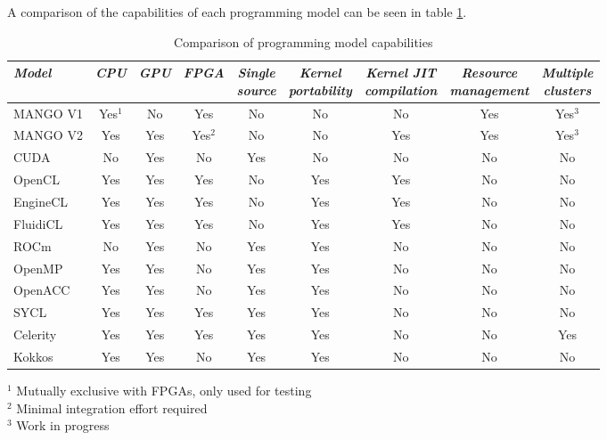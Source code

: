 A comparison of the capabilities of each programming model can be seen in table \ref{tab:progamming-model-comparison}.

\begin{table}[ht]
    \centering
    \begin{tabular}{l|c|c|c|c|c|c|c|c}
    \textit{Model} & \textit{CPU} & \textit{GPU} & \textit{FPGA} & \makecell{\textit{Single} \\ \textit{source}} & \makecell{\textit{Kernel} \\ \textit{portability}} & \makecell{\textit{Kernel JIT} \\ \textit{compilation}} & \makecell{\textit{Resource} \\ \textit{management}} & \makecell{\textit{Multiple} \\ \textit{clusters}} \\ \hline
    MANGO V1 & Yes$^1$ & No & Yes & No & No & No & Yes & Yes$^3$ \\
    MANGO V2 & Yes & Yes & Yes$^2$ & No & No & Yes & Yes & Yes$^3$ \\
    CUDA & No & Yes & No & Yes & No & No & No & No \\
    OpenCL & Yes & Yes & Yes & No & Yes & Yes & No & No \\
    EngineCL & Yes & Yes & Yes & No & Yes & Yes & No & No \\
    FluidiCL & Yes & Yes & Yes & No & Yes & Yes & No & No \\
    ROCm & No & Yes & No & Yes & Yes & No & No & No \\
    OpenMP & Yes & Yes & No & Yes & Yes & No & No & No  \\
    OpenACC & Yes & Yes & No & Yes & Yes & No & No & No  \\
    SYCL & Yes & Yes & Yes & Yes & Yes & No & No & No \\
    Celerity & Yes & Yes & Yes & Yes & Yes & No & No & Yes \\
    Kokkos & Yes & Yes & No & Yes & Yes & No & No & No 
    \end{tabular}
    \begin{flushleft}
    \footnotesize{
        $^1$ Mutually exclusive with FPGAs, only used for testing \\ 
        $^2$ Minimal integration effort required \\ 
        $^3$ Work in progress
    }
    \end{flushleft}
    \captionsetup{justification=centering}
    \caption{Comparison of programming model capabilities}
    \label{tab:progamming-model-comparison}
\end{table}


